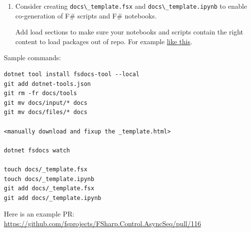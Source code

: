 \documentclass{article}
\begin{document}
\begin{enumerate}
\begin{lstlisting}
Target.create "ReleaseDocs" (fun _ ->
    Git.Repository.clone "" projectRepo "temp/gh-pages"
    Git.Branches.checkoutBranch "temp/gh-pages" "gh-pages"
    Shell.copyRecursive "output" "temp/gh-pages" true |> printfn "%A"
    Git.CommandHelper.runSimpleGitCommand "temp/gh-pages" "add ." |> printfn "%s"
    let cmd = sprintf """commit -a -m "Update generated documentation for version %s""" release.NugetVersion
    Git.CommandHelper.runSimpleGitCommand "temp/gh-pages" cmd |> printfn "%s"
    Git.Branches.push "temp/gh-pages"
)

\end{lstlisting}

\item 

Consider creating \texttt{docs{\textbackslash}\_template.fsx} and \texttt{docs{\textbackslash}\_template.ipynb} to enable co-generation of F\# scripts and F\# notebooks.


Add load sections to make sure your notebooks and scripts contain the right content to load packages out of repo.  For example \href{https://github.com/fsprojects/FSharp.Formatting/blob/master/docs/literate.fsx\#L1}{like this}.

\end{enumerate}



Sample commands:
\begin{lstlisting}
dotnet tool install fsdocs-tool --local
git add dotnet-tools.json   
git rm -fr docs/tools
git mv docs/input/* docs
git mv docs/files/* docs

<manually download and fixup the _template.html>

dotnet fsdocs watch

touch docs/_template.fsx
touch docs/_template.ipynb
git add docs/_template.fsx
git add docs/_template.ipynb

\end{lstlisting}


Here is an example PR: \href{https://github.com/fsprojects/FSharp.Control.AsyncSeq/pull/116}{https://github.com/fsprojects/FSharp.Control.AsyncSeq/pull/116}
\end{document}
